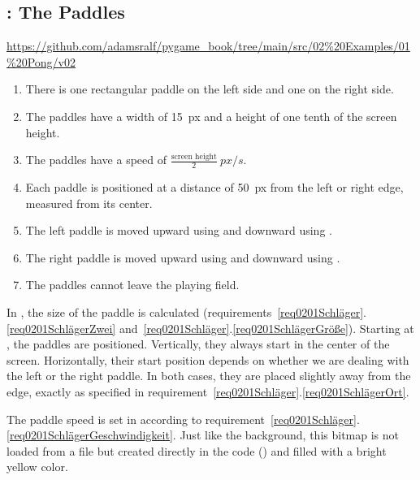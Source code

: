 \subsection{: The Paddles}
\begin{diskbox}
	\url{https://github.com/adamsralf/pygame_book/tree/main/src/02%20Examples/01%20Pong/v02}
\end{diskbox}
\begin{enumerate}
	\item There is one rectangular paddle on the left side and one on the right side.\label{req0201SchlägerZwei}
	\item The paddles have a width of \SI{15}{px} and a height of one tenth of the screen height.\label{req0201SchlägerGröße}
	\item The paddles have a speed of $\frac{\text{screen height}}{2}~px/s$.\label{req0201SchlägerGeschwindigkeit}
	\item Each paddle is positioned at a distance of \SI{50}{px} from the left or right edge, measured from its center.\label{req0201SchlägerOrt}
	\item The left paddle is moved upward using  and downward using .\label{req0201SchlägerTastenLinks}
	\item The right paddle is moved upward using \keys{\arrowkeyup} and downward using  \keys{\arrowkeydown}.\label{req0201SchlägerTastenRechts}
	\item The paddles cannot leave the playing field.\label{req0201SchlägerGefangen}
\end{enumerate}
\er


In , the size of the paddle is calculated (requirements~\ref{req0201Schläger}.\ref{req0201SchlägerZwei} and~\ref{req0201Schläger}.\ref{req0201SchlägerGröße}). Starting at , the paddles are positioned. Vertically, they always start in the center of the screen. Horizontally, their start position depends on whether we are dealing with the left or the right paddle. In both cases, they are placed slightly away from the edge, exactly as specified in requirement~\ref{req0201Schläger}.\ref{req0201SchlägerOrt}.

The paddle speed is set in  according to requirement~\ref{req0201Schläger}.\ref{req0201SchlägerGeschwindigkeit}.  
Just like the background, this bitmap is not loaded from a file but created directly in the code () and filled with a bright yellow color.

